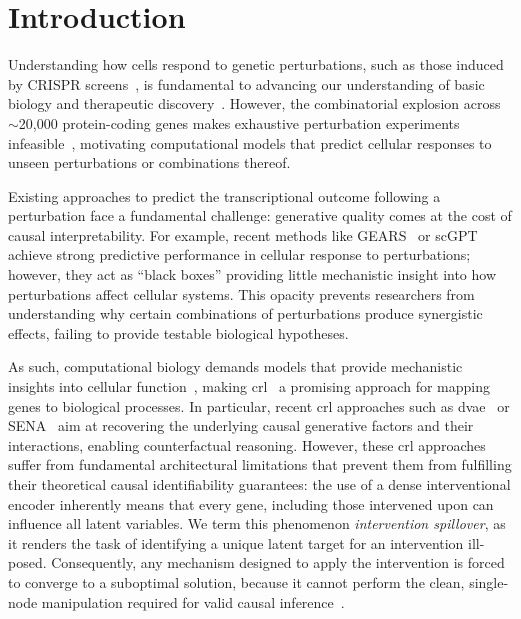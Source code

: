 \section{Introduction}
\label{sec:introduction}

Understanding how cells respond to genetic perturbations, such as those induced by CRISPR screens~\citep{dixit2016perturb}, is fundamental to advancing our understanding of basic biology and therapeutic discovery~\citep{plenge2013validating,adamson2016multiplexed,norman2019exploring}. 
However, the combinatorial explosion across $\sim$20,000 protein-coding genes makes exhaustive perturbation experiments infeasible~\citep{norman2019exploring}, motivating computational models that predict cellular responses to unseen perturbations or combinations thereof.

Existing approaches to predict the transcriptional outcome following a perturbation face a fundamental challenge: generative quality comes at the cost of causal interpretability.
For example, recent methods like GEARS~\citep{roohani2022gears} or scGPT~\citep{cui2024scgpt} achieve strong predictive performance in cellular response to perturbations; however, they act as ``black boxes'' providing little mechanistic insight into how perturbations affect cellular systems.
This opacity prevents researchers from understanding why certain combinations of perturbations produce synergistic effects, failing to provide testable biological hypotheses.


As such, computational biology demands models that provide mechanistic insights into cellular function~\citep{chen_applying_2024}, making \gls{crl}~\citep{scholkopf2021toward} a promising approach for mapping genes to biological processes.
In particular, recent \gls{crl} approaches such as \gls{dvae}~\citep{zhang2023identifiability} or SENA~\citep{de2025interpretable} aim at recovering the underlying causal generative factors and their interactions, enabling counterfactual reasoning.
However, these \gls{crl} approaches suffer from fundamental architectural limitations that prevent them from fulfilling their theoretical causal identifiability guarantees: the use of a dense interventional encoder inherently means that every gene, including those intervened upon can influence all latent variables.
We term this phenomenon \emph{intervention spillover}, as it renders the task of identifying a unique latent target for an intervention ill-posed.
Consequently, any mechanism designed to apply the intervention is forced to converge to a suboptimal solution, because it cannot perform the clean, single-node manipulation required for valid causal inference~\citep{brehmer2022weakly,lippe2022citris}.

